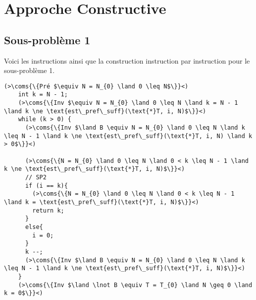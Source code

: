\section{Approche Constructive}

\subsection{Sous-problème 1}

Voici les instructions ainsi que la construction instruction par instruction pour le sous-problème 1.
\begin{lstlisting}[caption={Sous-problème 1}]
    (>\coms{\{Pré $\equiv N = N_{0} \land 0 \leq N$\}}<)
    int k = N - 1;
    (>\coms{\{Inv $\equiv N = N_{0} \land 0 \leq N \land k = N - 1 \land k \ne \text{est\_pref\_suff}(\text{*}T, i, N)$\}}<)
    while (k > 0) {
      (>\coms{\{Inv $\land B \equiv N = N_{0} \land 0 \leq N \land k \leq N - 1 \land k \ne \text{est\_pref\_suff}(\text{*}T, i, N) \land k > 0$\}}<)

      (>\coms{\{N = N_{0} \land 0 \leq N \land 0 < k \leq N - 1 \land k \ne \text{est\_pref\_suff}(\text{*}T, i, N)$\}}<)
      // SP2
      if (i == k){
        (>\coms{\{N = N_{0} \land 0 \leq N \land 0 < k \leq N - 1 \land k = \text{est\_pref\_suff}(\text{*}T, i, N)$\}}<)
        return k;
      }
      else{
        i = 0;
      }
      k --;
      (>\coms{\{Inv $\land B \equiv N = N_{0} \land 0 \leq N \land k \leq N - 1 \land k \ne \text{est\_pref\_suff}(\text{*}T, i, N)$\}}<)
    }
    (>\coms{\{Inv $\land \lnot B \equiv T = T_{0} \land N \geq 0 \land k = 0$\}}<)
\end{lstlisting}



